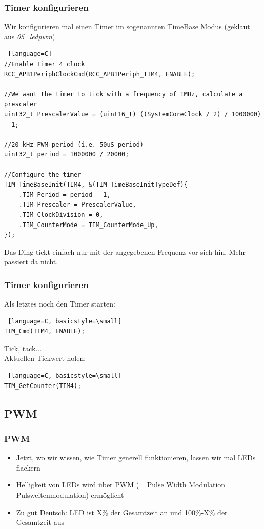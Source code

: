 \documentclass[ngerman,compress]{beamer}
\begin{document}
\begin{frame} [fragile]
	\frametitle{Timer konfigurieren}
	Wir konfigurieren mal einen Timer im sogenannten TimeBase Modus (geklaut aus \emph{05\_ledpwm}).
	\begin{lstlisting} [language=C]
//Enable Timer 4 clock
RCC_APB1PeriphClockCmd(RCC_APB1Periph_TIM4, ENABLE);

//We want the timer to tick with a frequency of 1MHz, calculate a prescaler
uint32_t PrescalerValue = (uint16_t) ((SystemCoreClock / 2) / 1000000) - 1;

//20 kHz PWM period (i.e. 50uS period)
uint32_t period = 1000000 / 20000;

//Configure the timer
TIM_TimeBaseInit(TIM4, &(TIM_TimeBaseInitTypeDef){
	.TIM_Period = period - 1,
	.TIM_Prescaler = PrescalerValue,
	.TIM_ClockDivision = 0,
	.TIM_CounterMode = TIM_CounterMode_Up,
});
	\end{lstlisting}
	Das Ding tickt einfach nur mit der angegebenen Frequenz vor sich hin. Mehr passiert da nicht.
\end{frame}

\begin{frame} [fragile]
	\frametitle{Timer konfigurieren}
Als letztes noch den Timer starten:
	\begin{lstlisting} [language=C, basicstyle=\small]
TIM_Cmd(TIM4, ENABLE);
	\end{lstlisting}
	Tick, tack... \\
\pause
Aktuellen Tickwert holen:
\begin{lstlisting} [language=C, basicstyle=\small]
TIM_GetCounter(TIM4);
	\end{lstlisting}
\end{frame}

\subsection{PWM}

\begin{frame}
	\frametitle{PWM}
	\begin{itemize}
		\item Jetzt, wo wir wissen, wie Timer generell funktionieren, lassen wir mal LEDs flackern
		\item Helligkeit von LEDs wird über PWM (= Pulse Width Modulation = Pulsweitenmodulation) ermöglicht
		\item Zu gut Deutsch: LED ist X\% der Gesamtzeit an und 100\%-X\% der Gesamtzeit aus
	\end{itemize}
\end{frame}
\end{document}
